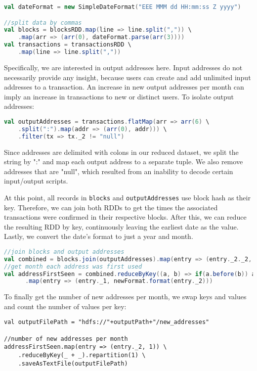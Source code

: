 \documentclass[9pt,twocolumn,twoside]{idsi}
\begin{document}
\begin{lstlisting}[language=Scala]
val dateFormat = new SimpleDateFormat("EEE MMM dd HH:mm:ss Z yyyy")

//split data by commas
val blocks = blocksRDD.map(line => line.split(",")) \
    .map(arr => (arr(0), dateFormat.parse(arr(3))))
val transactions = transactionsRDD \
    .map(line => line.split(","))
\end{lstlisting}

Specifically, we are interested in output addresses here. Input addresses do not necessarily provide any insight, because users can create and add unlimited input addresses to a transaction. An increase in new output addresses per month can imply an increase in transactions to new or distinct users. To isolate output addresses:

\begin{lstlisting}[language=Scala]
val outputAddresses = transactions.flatMap(arr => arr(6) \
    .split(":").map(addr => (arr(0), addr))) \
    .filter(tx => tx._2 != "null")
\end{lstlisting}

Since addresses are delimited with colons in our reduced dataset, we split the string by ":" and map each output address to a separate tuple. We also remove addresses that are "null", which resulted from an inability to decode certain input/output scripts.

At this point, all records in \lstinline{blocks} and \lstinline{outputAddresses} use block hash as their key. Therefore, we can join both RDDs to get the times the associated transactions were confirmed in their respective blocks. After this, we can reduce the resulting RDD by key, continuously leaving the earliest date as the value. Lastly, we convert the date's format to just a year and month.

\begin{lstlisting}[language=Scala]
//join blocks and output addresses
val combined = blocks.join(outputAddresses).map(entry => (entry._2._2, entry._2._1))
//get month each address was first used
val addressFirstSeen = combined.reduceByKey((a, b) => if(a.before(b)) a else b) \
      .map(entry => (entry._1, newFormat.format(entry._2)))
\end{lstlisting}

To finally get the number of new addresses per month, we swap keys and values and count the number of values per key:

\begin{lstlisting}
val outputFilePath = "hdfs://"+outputPath+"/new_addresses"

//number of new addresses per month
addressFirstSeen.map(entry => (entry._2, 1)) \
    .reduceByKey(_ + _).repartition(1) \
    .saveAsTextFile(outputFilePath)
\end{lstlisting}
\end{document}
